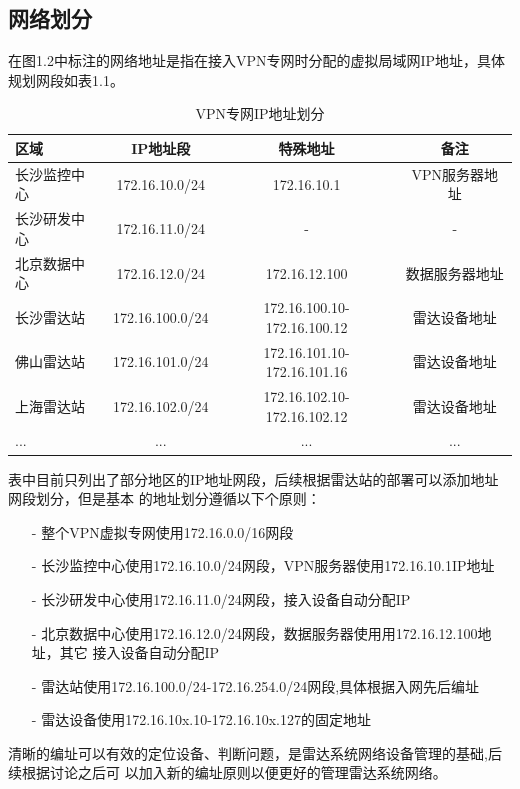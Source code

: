 \documentclass[a4paper,12pt]{report}
\begin{document}
\begin{spacing}{1.5}
\section{网络划分}
在图1.2中标注的网络地址是指在接入VPN专网时分配的虚拟局域网IP地址，具体规划网段如表1.1。
\begin{table}[hbtp]
	\centering
	\begin{tabular}{|l|c|c|c|}
	\hline
	区域 & IP地址段 & 特殊地址 & 备注\\
	\hline
	长沙监控中心 & 172.16.10.0/24  & 172.16.10.1   & VPN服务器地址\\
	\hline
	长沙研发中心 & 172.16.11.0/24  & - & -\\
	\hline
	北京数据中心 & 172.16.12.0/24  & 172.16.12.100 & 数据服务器地址\\
	\hline
	长沙雷达站   & 172.16.100.0/24 & 172.16.100.10-172.16.100.12 & 雷达设备地址\\
	\hline
	佛山雷达站   & 172.16.101.0/24 & 172.16.101.10-172.16.101.16 & 雷达设备地址\\
	\hline
	上海雷达站   & 172.16.102.0/24 & 172.16.102.10-172.16.102.12 & 雷达设备地址\\
	\hline
	...    		& ...             & ... & ...\\
	\hline
	\end{tabular}
	\caption{VPN专网IP地址划分}
	\label{tab:IPaddress}
\end{table}

表中目前只列出了部分地区的IP地址网段，后续根据雷达站的部署可以添加地址网段划分，但是基本
的地址划分遵循以下个原则：
\begin{itemize}
\itemsep=3pt
\parskip=0pt
\setlength{\itemindent}{1em} 
\item[-] 整个VPN虚拟专网使用172.16.0.0/16网段
\item[-] 长沙监控中心使用172.16.10.0/24网段，VPN服务器使用172.16.10.1IP地址
\item[-] 长沙研发中心使用172.16.11.0/24网段，接入设备自动分配IP
\item[-] 北京数据中心使用172.16.12.0/24网段，数据服务器使用用172.16.12.100地址，其它
接入设备自动分配IP
\item[-] 雷达站使用172.16.100.0/24-172.16.254.0/24网段,具体根据入网先后编址
\item[-] 雷达设备使用172.16.10x.10-172.16.10x.127的固定地址
\end{itemize}

清晰的编址可以有效的定位设备、判断问题，是雷达系统网络设备管理的基础,后续根据讨论之后可
以加入新的编址原则以便更好的管理雷达系统网络。


\end{spacing}
\end{document}
